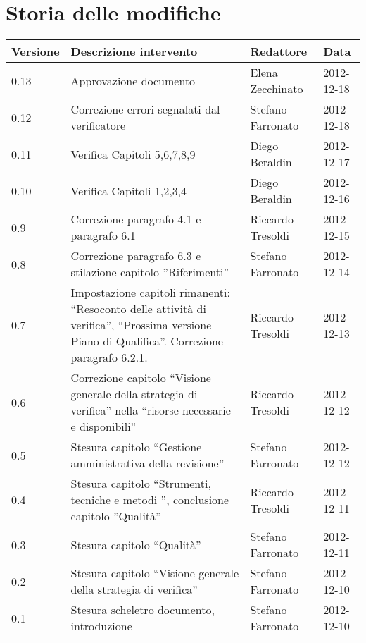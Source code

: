 \section*{Storia delle modifiche}
\begin{tabularx}{\textwidth}{lXll}
\toprule
Versione & Descrizione intervento & Redattore & Data\\
\midrule %
0.13 & Approvazione documento & Elena Zecchinato & 2012-12-18\\
0.12 & Correzione errori segnalati dal verificatore & Stefano Farronato & 2012-12-18\\
0.11 & Verifica Capitoli 5,6,7,8,9 & Diego Beraldin & 2012-12-17\\
0.10 & Verifica Capitoli 1,2,3,4 & Diego Beraldin & 2012-12-16\\
0.9 & Correzione paragrafo 4.1 e paragrafo 6.1 & Riccardo Tresoldi & 2012-12-15\\
0.8 & Correzione paragrafo 6.3 e stilazione capitolo ''Riferimenti''& Stefano Farronato & 2012-12-14\\
0.7 & Impostazione capitoli rimanenti: ``Resoconto delle attività di verifica'', ``Prossima versione Piano di Qualifica''. Correzione paragrafo 6.2.1. & Riccardo Tresoldi & 2012-12-13\\
0.6 & Correzione capitolo ``Visione generale della strategia di verifica'' nella ``risorse necessarie e disponibili'' & Riccardo Tresoldi & 2012-12-12\\
0.5 & Stesura capitolo ``Gestione amministrativa della revisione''& Stefano Farronato & 2012-12-12\\
0.4 & Stesura capitolo ``Strumenti, tecniche e metodi '', conclusione capitolo ''Qualità'' & Riccardo Tresoldi & 2012-12-11\\
0.3 & Stesura capitolo ``Qualità'' & Stefano Farronato & 2012-12-11\\
0.2 & Stesura capitolo ``Visione generale della strategia di verifica'' & Stefano Farronato & 2012-12-10\\
0.1 & Stesura scheletro documento, introduzione & Stefano Farronato & 2012-12-10\\
\bottomrule
\end{tabularx}
\newpage



\setcounter{page}{1}
\pagestyle{normal}

